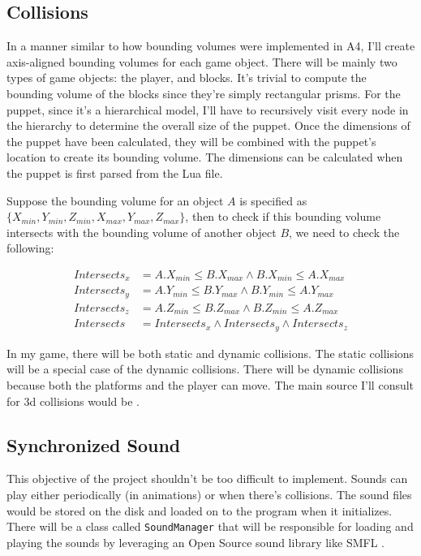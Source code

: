 \documentclass[11pt]{article}
\begin{document}
\subsection{Collisions}
In a manner similar to how bounding volumes were implemented in A4, I'll create axis-aligned bounding volumes for each game object. There will be mainly two types of game objects: the player, and blocks. It's trivial to compute the bounding volume of the blocks since they're simply rectangular prisms. For the puppet, since it's a hierarchical model, I'll have to recursively visit every node in the hierarchy to determine the overall size of the puppet. Once the dimensions of the puppet have been calculated, they will be combined with the puppet's location to create its bounding volume. The dimensions can be calculated when the puppet is first parsed from the Lua file.

Suppose the bounding volume for an object $A$ is specified as $\{X_{min}, Y_{min}, Z_{min}, X_{max}, Y_{max}, Z_{max}\}$, then to check if this bounding volume intersects with the bounding volume of another object $B$, we need to check the following:

\begin{align*}
Intersects_x &= A.X_{min} \leq B.X_{max} \land B.X_{min} \leq A.X_{max} \\
Intersects_y &= A.Y_{min} \leq B.Y_{max} \land B.Y_{min} \leq A.Y_{max} \\
Intersects_z &= A.Z_{min} \leq B.Z_{max} \land B.Z_{min} \leq A.Z_{max} \\
Intersects &= Intersects_x \land Intersects_y \land Intersects_z
\end{align*}

In my game, there will be both static and dynamic collisions. The static collisions will be a special case of the dynamic collisions. There will be dynamic collisions because both the platforms and the player can move. The main source I'll consult for 3d collisions would be \cite{mdn3dcd}.

\subsection{Synchronized Sound}
This objective of the project shouldn't be too difficult to implement. Sounds can play either periodically (in animations) or when there's collisions. The sound files would be stored on the disk and loaded on to the program when it initializes. There will be a class called \verb|SoundManager| that will be responsible for loading and playing the sounds by leveraging an Open Source sound library like SMFL \cite{smfl-docs}.
\end{document}
